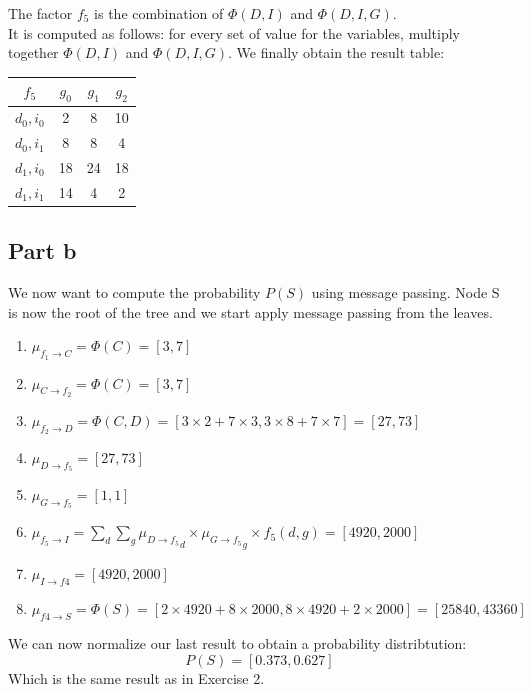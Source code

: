 \documentclass[a4paper, 10pt]{article}
\begin{document}
The factor $f_5$ is the combination of $\Phi(D,I)$ and $\Phi(D,I,G)$. 
\\
It is computed as follows: for every set of value for the variables, multiply together $\Phi(D,I)$ and $\Phi(D,I,G)$.
We finally obtain the result table:
\begin{center}
\begin{tabular}{ |c|c|c|c| }
    \hline
    $f_5$ & $g_0$ & $g_1$ & $g_2$ \\
    \hline
    $d_0,i_0$ & 2 & 8 & 10\\
    \hline
    $d_0,i_1$ & 8 & 8 & 4\\
    \hline
    $d_1,i_0$ & 18 & 24 & 18\\
    \hline
    $d_1,i_1$ & 14 & 4 & 2\\
    \hline
\end{tabular}
\end{center}
\subsection{Part b}
We now want to compute the probability $P(S)$ using message passing.
Node S is now the root of the tree and we start apply message passing from the leaves.
\begin{enumerate}
    \item $\mu_{f_1\rightarrow C} = \Phi(C) = \left[3, 7\right]$
    \item $\mu_{C\rightarrow f_2} = \Phi(C) = \left[3, 7\right]$
    \item $\mu_{f_2\rightarrow D} = \Phi(C,D) = \left[3\times 2+ 7\times 3, 3\times 8 + 7 \times 7\right] = \left[27, 73\right]$
    \item $\mu_{D\rightarrow f_5} = \left[27, 73\right]$
    \item $\mu_{G\rightarrow f_5} = \left[1, 1\right]$
    \item $\mu_{f_5\rightarrow I} = \sum_d \sum_g  {\mu_{D\rightarrow f_5}}_d \times {\mu_{G\rightarrow f_5}}_g \times f_5(d,g) = \left[4920, 2000\right]$
    \item $\mu_{I\rightarrow f4} = \left[4920, 2000\right]$
    \item $\mu_{f4\rightarrow S} = \Phi(S) = \left[2\times4920+8\times2000, 8\times4920+2\times2000\right] = \left[25840, 43360\right]$
\end{enumerate}
We can now normalize our last result to obtain a probability distribtution:
$$
P(S) = \left[0.373, 0.627\right]
$$
Which is the same result as in Exercise 2.
\end{document}
